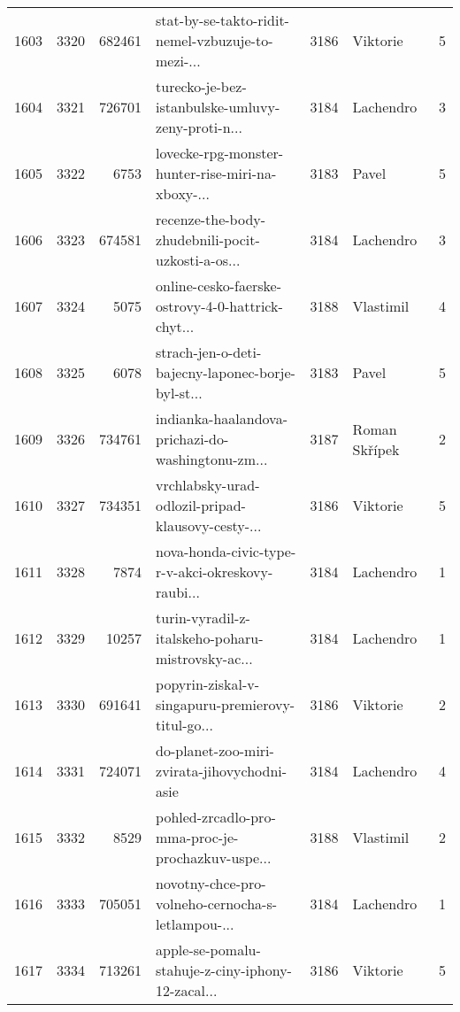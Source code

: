\begin{tabular}{lrrlrlr}
1603 &       3320 &   682461 &  stat-by-se-takto-ridit-nemel-vzbuzuje-to-mezi-... &     3186 &                     Viktorie &               5 \\
1604 &       3321 &   726701 &  turecko-je-bez-istanbulske-umluvy-zeny-proti-n... &     3184 &                    Lachendro &               3 \\
1605 &       3322 &     6753 &  lovecke-rpg-monster-hunter-rise-miri-na-xboxy-... &     3183 &                        Pavel &               5 \\
1606 &       3323 &   674581 &  recenze-the-body-zhudebnili-pocit-uzkosti-a-os... &     3184 &                    Lachendro &               3 \\
1607 &       3324 &     5075 &  online-cesko-faerske-ostrovy-4-0-hattrick-chyt... &     3188 &                    Vlastimil &               4 \\
1608 &       3325 &     6078 &  strach-jen-o-deti-bajecny-laponec-borje-byl-st... &     3183 &                        Pavel &               5 \\
1609 &       3326 &   734761 &  indianka-haalandova-prichazi-do-washingtonu-zm... &     3187 &                Roman Skřípek &               2 \\
1610 &       3327 &   734351 &  vrchlabsky-urad-odlozil-pripad-klausovy-cesty-... &     3186 &                     Viktorie &               5 \\
1611 &       3328 &     7874 &  nova-honda-civic-type-r-v-akci-okreskovy-raubi... &     3184 &                    Lachendro &               1 \\
1612 &       3329 &    10257 &  turin-vyradil-z-italskeho-poharu-mistrovsky-ac... &     3184 &                    Lachendro &               1 \\
1613 &       3330 &   691641 &  popyrin-ziskal-v-singapuru-premierovy-titul-go... &     3186 &                     Viktorie &               2 \\
1614 &       3331 &   724071 &       do-planet-zoo-miri-zvirata-jihovychodni-asie &     3184 &                    Lachendro &               4 \\
1615 &       3332 &     8529 &  pohled-zrcadlo-pro-mma-proc-je-prochazkuv-uspe... &     3188 &                    Vlastimil &               2 \\
1616 &       3333 &   705051 &  novotny-chce-pro-volneho-cernocha-s-letlampou-... &     3184 &                    Lachendro &               1 \\
1617 &       3334 &   713261 &  apple-se-pomalu-stahuje-z-ciny-iphony-12-zacal... &     3186 &                     Viktorie &               5 \\

\end{tabular}
